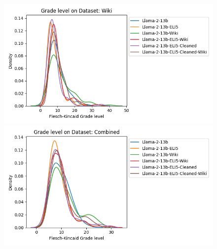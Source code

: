 \documentclass[11pt, oneside]{article}   	%
\begin{document}
\begin{figure}
\\
\includegraphics[scale=.5]{./figures/FKG_13B_Wiki.png}
\includegraphics[scale=.5]{./figures/FKG_13B_full.png}
\end{figure}
\end{document}
